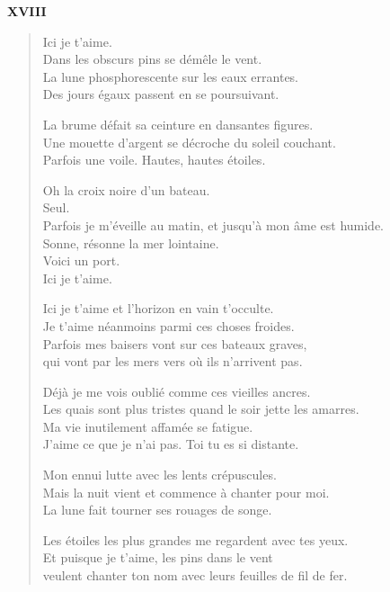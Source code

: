 \documentclass[11pt,a4paper]{book}
\begin{document}
\newpage


\begin{center} \textbf{XVIII} \end{center}

\bigskip

\begin{verse}
  Ici je t'aime. \\
  Dans les obscurs pins se démêle le vent. \\
  La lune phosphorescente sur les eaux errantes. \\
  Des jours égaux passent en se poursuivant.

  La brume défait sa ceinture en dansantes figures. \\
  Une mouette d'argent se décroche du soleil couchant. \\
  Parfois une voile. Hautes, hautes étoiles.

  Oh la croix noire d'un bateau. \\
  Seul. \\
  Parfois je m'éveille au matin, et jusqu'à mon âme est humide. \\
  Sonne, résonne la mer lointaine. \\
  Voici un port. \\
  Ici je t'aime.

  Ici je t'aime et l'horizon en vain t'occulte. \\
  Je t'aime néanmoins parmi ces choses froides. \\
  Parfois mes baisers vont sur ces bateaux graves, \\
  qui vont par les mers vers où ils n'arrivent pas.

  Déjà je me vois oublié comme ces vieilles ancres. \\
  Les quais sont plus tristes quand le soir jette les amarres. \\
  Ma vie inutilement affamée se fatigue. \\
  J'aime ce que je n'ai pas. Toi tu es si distante.

  Mon ennui lutte avec les lents crépuscules. \\
  Mais la nuit vient et commence à chanter pour moi. \\
  La lune fait tourner ses rouages de songe.

  Les étoiles les plus grandes me regardent avec tes yeux. \\
  Et puisque je t'aime, les pins dans le vent \\
  veulent chanter ton nom avec leurs feuilles de fil de fer.
\end{verse}
\end{document}
